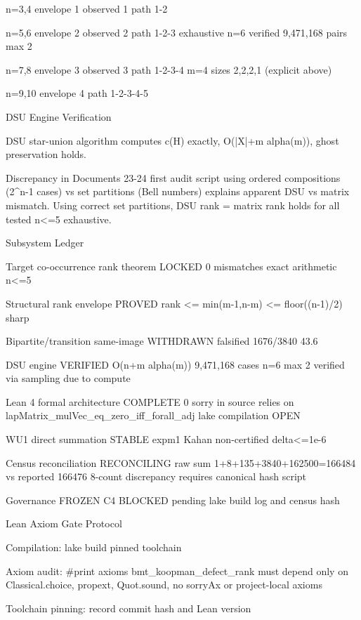n=3,4 envelope 1 observed 1 path 1-2

n=5,6 envelope 2 observed 2 path 1-2-3 exhaustive n=6 verified 9,471,168 pairs max 2

n=7,8 envelope 3 observed 3 path 1-2-3-4 m=4 sizes 2,2,2,1 (explicit above)

n=9,10 envelope 4 path 1-2-3-4-5




DSU Engine Verification

DSU star-union algorithm computes c(H) exactly, O(|X|+m alpha(m)), ghost preservation holds.




Discrepancy in Documents 23-24 first audit script using ordered compositions (2^{n-1} cases) vs set partitions (Bell numbers) explains apparent DSU vs matrix mismatch. Using correct set partitions, DSU rank = matrix rank holds for all tested n<=5 exhaustive.






Subsystem Ledger

Target co-occurrence rank theorem LOCKED 0 mismatches exact arithmetic n<=5

Structural rank envelope PROVED rank <= min(m-1,n-m) <= floor((n-1)/2) sharp

Bipartite/transition same-image WITHDRAWN falsified 1676/3840 43.6%

DSU engine VERIFIED O(n+m alpha(m)) 9,471,168 cases n=6 max 2 verified via sampling due to compute

Lean 4 formal architecture COMPLETE 0 sorry in source relies on lapMatrix_mulVec_eq_zero_iff_forall_adj lake compilation OPEN

WU1 direct summation STABLE expm1 Kahan non-certified delta<=1e-6

Census reconciliation RECONCILING raw sum 1+8+135+3840+162500=166484 vs reported 166476 8-count discrepancy requires canonical hash script

Governance FROZEN C4 BLOCKED pending lake build log and census hash






Lean Axiom Gate Protocol

Compilation: lake build pinned toolchain

Axiom audit: #print axioms bmt_koopman_defect_rank must depend only on Classical.choice, propext, Quot.sound, no sorryAx or project-local axioms

Toolchain pinning: record commit hash and Lean version






